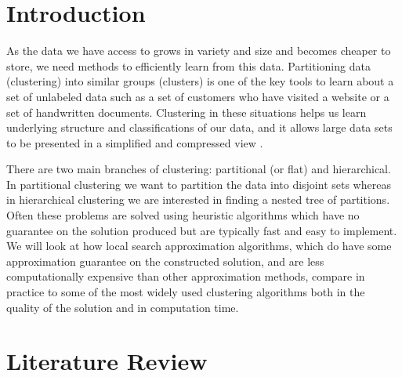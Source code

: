 \documentclass{article}
\begin{document}
 



\section{Introduction}
As the data we have access to grows in variety and size and becomes cheaper to store, we need methods to efficiently learn from this data. 
Partitioning data (clustering) into similar groups (clusters) is one of the key tools to learn about a set of unlabeled data such as a set of customers who have visited a website or a set of handwritten documents.
Clustering in these situations helps us learn underlying structure and classifications of our data, and it allows large data sets to be presented in a simplified and compressed view \cite{Jain}.

There are two main branches of clustering: partitional (or flat) and hierarchical. In partitional clustering we want to partition the data into disjoint sets whereas in hierarchical clustering we are interested in finding a nested tree of partitions. Often these problems are solved using heuristic algorithms which have no guarantee on the solution produced but are typically fast and easy to implement. We will look at how local search approximation algorithms, which do have some approximation guarantee on the constructed solution, and are less computationally expensive than other approximation methods, compare in practice to some of the most widely used clustering algorithms both in the quality of the solution and in computation time. 

\section{Literature Review}
\end{document}
